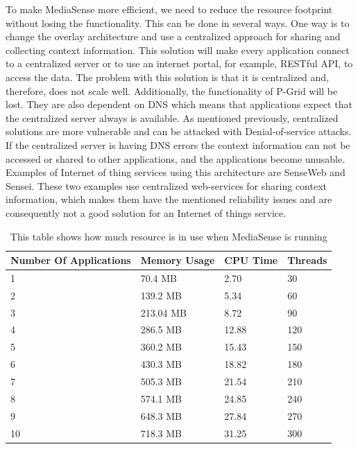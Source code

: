 To make MediaSense more efficient, we need to reduce the resource footprint without losing  the functionality. This can be done in several ways. One way is to change the overlay architecture and use a centralized approach for sharing and collecting context information. This solution will make every application connect to a centralized server or to use an internet portal, for example, RESTful API, to access the data. The problem with this solution is that it is centralized and, therefore, does not scale well. Additionally, the functionality of P-Grid will be lost. They are also dependent on DNS which means that applications expect that the centralized server always is available. As mentioned previously, centralized solutions are more vulnerable and can be attacked with Denial-of-service attacks. If the centralized server is having DNS errors the context information can not be accessed or shared to other applications, and the applications become unusable. Examples of Internet of thing services using this architecture are SenseWeb and Sensei. These two examples use centralized web-services for sharing context information, which makes them have the mentioned reliability issues and are consequently not a good solution for an Internet of things service.

\begin{center}
\begin{table}
    \begin{tabularx}{\textwidth}{ |X|X|X|X| }
    \hline
    Number Of Applications 								& Memory Usage 									& CPU Time							& Threads\\ \hline
    1 													& 70.4 MB 										& 2.70 								& 30 \\ \hline
    2 													& 139.2 MB										& 5.34 								& 60 \\ \hline
    3 													& 213.04 MB										& 8.72 								& 90 \\ \hline
    4 													& 286.5 MB										& 12.88 							& 120 \\ \hline
    5													& 360.2 MB										& 15.43  							& 150 \\ \hline
    6													& 430.3 MB										& 18.82  							& 180 \\ \hline	
    7													& 505.3 MB										& 21.54  							& 210 \\ \hline
    8													& 574.1 MB										& 24.85  							& 240 \\ \hline
    9													& 648.3 MB										& 27.84	  							& 270 \\ \hline
    10													& 718.3 MB										& 31.25  							& 300 \\ \hline
    \end{tabularx}
   	\caption{This table shows how much resource is in use when MediaSense is running}
	\label{tab:test_table}
\end{table}
\end{center}
